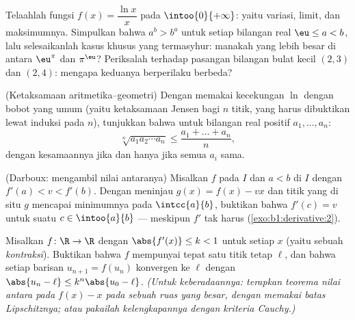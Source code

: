 \begin{exercise}[$\star\star$]\label{exo:b1:derivative:8}
Telaahlah fungsi $f(x) = \dfrac{\ln x}{x}$ pada
$\intoo{0}{+\infty}$: yaitu variasi, limit, dan maksimumnya. Simpulkan bahwa $a^b
> b^a$ untuk setiap bilangan real $\eu \leq a < b$, lalu selesaikanlah kasus khusus
yang termasyhur: manakah yang lebih besar di antara $\eu^\pi$ dan $\pi^\eu$? Periksalah terhadap
pasangan bilangan bulat kecil $(2,3)$ dan $(2,4)$: mengapa keduanya berperilaku
berbeda?
\end{exercise}

\begin{exercise}[$\star\star$]\label{exo:b1:derivative:9}
(Ketaksamaan aritmetika--geometri) Dengan memakai kecekungan $\ln$ dengan
bobot yang umum (yaitu ketaksamaan Jensen bagi $n$ titik, yang harus dibuktikan lewat
induksi pada $n$), tunjukkan bahwa untuk bilangan real positif $a_1, \dots, a_n$:
\[
\sqrt[n]{a_1 a_2 \cdots a_n} \leq \frac{a_1 + \dots + a_n}{n},
\]
dengan kesamaannya jika dan hanya jika semua $a_i$ sama.
\end{exercise}

\begin{exercise}[$\star\star\star$]\label{exo:b1:derivative:10}
(Darboux:  mengambil nilai antaranya) Misalkan $f$
 pada $I$ dan $a < b$ di $I$ dengan $f'(a) < v < f'(b)$.
Dengan meninjau $g(x) = f(x) - vx$ dan titik yang di situ $g$ mencapai
minimumnya pada $\intcc{a}{b}$, buktikan bahwa $f'(c) = v$ untuk suatu $c
\in \intoo{a}{b}$ --- meskipun $f'$ tak harus 
(\cref{exo:b1:derivative:2}).
\end{exercise}

\begin{exercise}[$\star\star\star$]\label{exo:b1:derivative:11}
Misalkan $f \colon \R \to \R$  dengan $\abs{f'(x)} \leq k
< 1$ untuk setiap $x$ (yaitu sebuah \emph{kontraksi}). Buktikan bahwa $f$ mempunyai tepat
satu titik tetap $\ell$, dan bahwa setiap barisan $u_{n+1} = f(u_n)$
konvergen ke $\ell$ dengan $\abs{u_n - \ell} \leq k^n\abs{u_0 -
\ell}$. \emph{(Untuk keberadaannya: terapkan teorema nilai antara pada
$f(x) - x$ pada sebuah ruas yang besar, dengan memakai batas Lipschitznya; atau pakailah
kelengkapannya dengan kriteria Cauchy.)}
\end{exercise}

